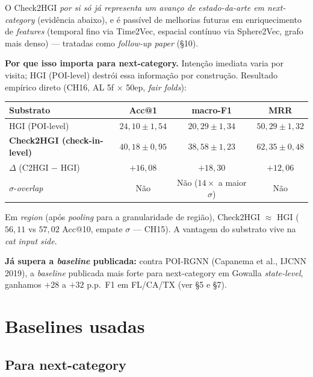 \documentclass[11pt,a4paper]{article}
\begin{document}
O Check2HGI \textit{por si só já representa um avanço de estado-da-arte em next-category} (evidência abaixo), e é passível de melhorias futuras em enriquecimento de \textit{features} (temporal fino via Time2Vec, espacial contínuo via Sphere2Vec, grafo mais denso) --- tratadas como \textit{follow-up paper} (§10).

\noindent\textbf{Por que isso importa para next-category.} Intenção imediata varia por visita; HGI (POI-level) destrói essa informação por construção. Resultado empírico direto (CH16, AL 5f $\times$ 50ep, \textit{fair folds}):

\begin{table}[H]
\centering
\small
\begin{tabular}{lccc}
\toprule
\textbf{Substrato} & \textbf{Acc@1} & \textbf{macro-F1} & \textbf{MRR} \\
\midrule
HGI (POI-level) & $24{,}10 \pm 1{,}54$ & $20{,}29 \pm 1{,}34$ & $50{,}29 \pm 1{,}32$ \\
\textbf{Check2HGI (check-in-level)} & \textbf{$40{,}18 \pm 0{,}95$} & \textbf{$38{,}58 \pm 1{,}23$} & \textbf{$62{,}35 \pm 0{,}48$} \\
$\Delta$ (C2HGI $-$ HGI) & \textbf{$+16{,}08$} & \textbf{$+18{,}30$} & \textbf{$+12{,}06$} \\
$\sigma$-\textit{overlap} & Não & Não ($14\times$ a maior $\sigma$) & Não \\
\bottomrule
\end{tabular}
\end{table}

Em \emph{region} (após \textit{pooling} para a granularidade de região), Check2HGI $\approx$ HGI ($56{,}11$ vs $57{,}02$ Acc@10, empate $\sigma$ --- CH15). A vantagem do substrato vive na \emph{cat input side}.

\noindent\textbf{Já supera a \textit{baseline} publicada:} contra POI-RGNN (Capanema et al., IJCNN 2019), a \textit{baseline} publicada mais forte para next-category em Gowalla \textit{state-level}, ganhamos $+28$ a $+32$ p.p.\ F1 em FL/CA/TX (ver §5 e §7).

\section{Baselines usadas}

\subsection{Para next-category}
\end{document}
